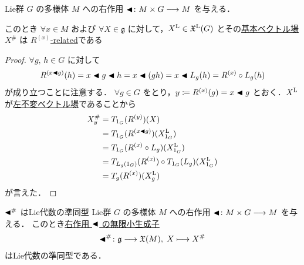 \documentclass[TQFT_main]{subfiles}
\begin{document}
\begin{mylem}[label=lem:fundamental-vecf]{}
    Lie群 $G$ の\cinfty 多様体 $M$ への右作用 $\blacktriangleleft \colon M \times G \longrightarrow M$ を与える．
    
    このとき $\forall x \in M$ および $\forall X \in \mathfrak{g}$ に対して，$X^{\mathrm{L}} \in \mathfrak{X}^{\mathrm{L}}(G)$ とその\hyperref[def:fundamental-vecf]{基本ベクトル場} $X^\#$ は $R^{(x)}$\hyperref[def:F-related]{-related}である
\end{mylem}

\begin{proof}
    $\forall g,\, h \in G$ に対して
    \begin{align}
        R^{(x \blacktriangleleft g)}(h) = x \blacktriangleleft g \blacktriangleleft h = x \blacktriangleleft(gh) = x \blacktriangleleft L_g(h) = R^{(x)} \circ L_g(h)
    \end{align}
    が成り立つことに注意する．
    $\forall g \in G$ をとり，$y \coloneqq R^{(x)}(g) = x \blacktriangleleft g$ とおく．$X^{\mathrm{L}}$ が\hyperref[def:left-invariant]{左不変ベクトル場}であることから
    \begin{align}
        X^\#_y &= T_{1_G}(R^{(y)})(X) \\
        &= T_{1_G} (R^{(x \blacktriangleleft g)}) (X^{\mathrm{L}}_{1_G}) \\
        &= T_{1_G} (R^{(x)} \circ L_g)(X^{\mathrm{L}}_{1_G}) \\
        &= T_{L_g(1_G)} (R^{(x)}) \circ T_{1_G}(L_g)(X^{\mathrm{L}}_{1_G}) \\
        &= T_{g} (R^{(x)}) (X^{\mathrm{L}}_g)
    \end{align}
    が言えた．
\end{proof}


\begin{myprop}[label=prop:infinitesimal-generator-R]{$\blacktriangleleft^\#$ はLie代数の準同型}
    Lie群 $G$ の\cinfty 多様体 $M$ への右作用 $\blacktriangleleft \colon M \times G \longrightarrow M$ を与える．
    このとき\hyperref[def:fundamental-vecf]{右作用 $\blacktriangleleft$ の無限小生成子}
    \begin{align}
        \blacktriangleleft^\# \colon \mathfrak{g} \longrightarrow \mathfrak{X}(M),\; X \longmapsto X^\#
    \end{align}
    はLie代数の準同型である．
\end{myprop}
\end{document}
